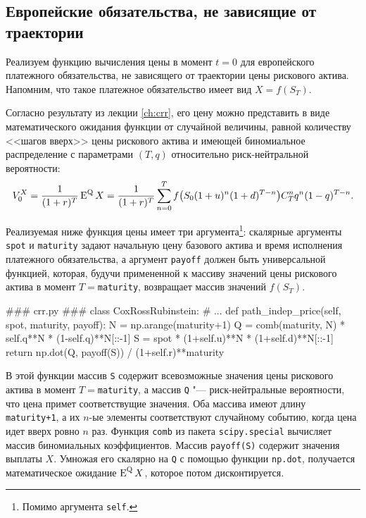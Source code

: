 \subsection{Европейские обязательства, не зависящие от траектории}
Реализуем функцию вычисления цены в момент $t=0$ для европейского платежного обязательства, не зависящего от траектории цены рискового актива. Напомним, что такое платежное обязательство имеет вид $X=f(S_T)$.

Согласно результату из лекции \ref{ch:crr}, его цену можно представить в виде математического ожидания функции от случайной величины, равной количеству <<шагов вверх>> цены рискового актива и имеющей биномиальное распределение с параметрами $(T,q)$ относительно риск-нейтральной вероятности:
\[
V_0^X = \frac{1}{(1+r)^T}\operatorname{E}^{\mathrm{Q}} X = \frac{1}{(1+r)^T} \sum_{n=0}^T f\bigl(S_0(1+u)^n(1+d)^{T-n}\bigr) C_T^n q^n (1-q)^{T-n}.
\]

Реализуемая ниже функция цены имеет три аргумента\footnote{Помимо аргумента \verb"self".}: скалярные аргументы \verb"spot" и \verb"maturity" задают начальную цену базового актива и время исполнения платежного обязательства, а аргумент \verb"payoff" должен быть универсальной функцией, которая, будучи примененной к массиву значений цены рискового актива в момент $T=$\;\verb"maturity", возвращает массив значений $f(S_T)$. 
\begin{python}
### crr.py ###
class CoxRossRubinstein:
    # ...
    def path_indep_price(self, spot, maturity, payoff):
        N = np.arange(maturity+1)
        Q = comb(maturity, N) * self.q**N * (1-self.q)**N[::-1]
        S = spot * (1+self.u)**N * (1+self.d)**N[::-1]
        return np.dot(Q, payoff(S)) / (1+self.r)**maturity
\end{python}

В этой функции массив \verb"S" содержит всевозможные значения цены рискового актива в момент $T=$\;\verb"maturity", а массив \verb"Q" "--- риск-нейтральные вероятности, что цена примет соответствущие значения.
Оба массива имеют длину \verb"maturity+1", а их $n$-ые элементы соответствуют случайному событию, когда цена идет вверх ровно $n$ раз.
Функция \verb"comb" из пакета \verb"scipy.special" вычисляет массив биномиальных коэффициентов. 
Массив \verb"payoff(S)" содержит значения выплаты $X$.
Умножая его скалярно на \verb"Q" с помощью функции \verb"np.dot", получается математическое ожидание $\operatorname{E}^{\mathrm{Q}} X$, которое потом дисконтируется.

